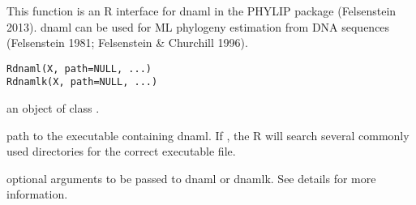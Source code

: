 \documentclass[a4paper]{book}
\begin{document}
%
\begin{Description}\relax
This function is an R interface for dnaml in the PHYLIP package (Felsenstein 2013). dnaml can be used for ML phylogeny estimation from DNA sequences (Felsenstein 1981; Felsenstein \& Churchill 1996).
\end{Description}
%
\begin{Usage}
\begin{verbatim}
Rdnaml(X, path=NULL, ...)
Rdnamlk(X, path=NULL, ...)
\end{verbatim}
\end{Usage}
%
\begin{Arguments}
\begin{ldescription}
\item[\code{X}] an object of class .
\item[\code{path}] path to the executable containing dnaml. If , the R will search several commonly used directories for the correct executable file.
\item[\code{...}] optional arguments to be passed to dnaml or dnamlk. See details for more information.
\end{ldescription}
\end{Arguments}
%
\end{document}
